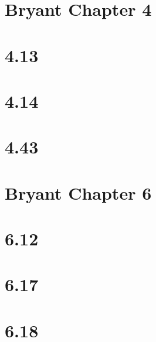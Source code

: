 \documentclass{article}
\begin{document}
\section*{Bryant Chapter 4}

\section*{4.13}


\section*{4.14}


\section*{4.43}


\section*{Bryant Chapter 6}

\section*{6.12}


\section*{6.17}


\section*{6.18}
\end{document}
